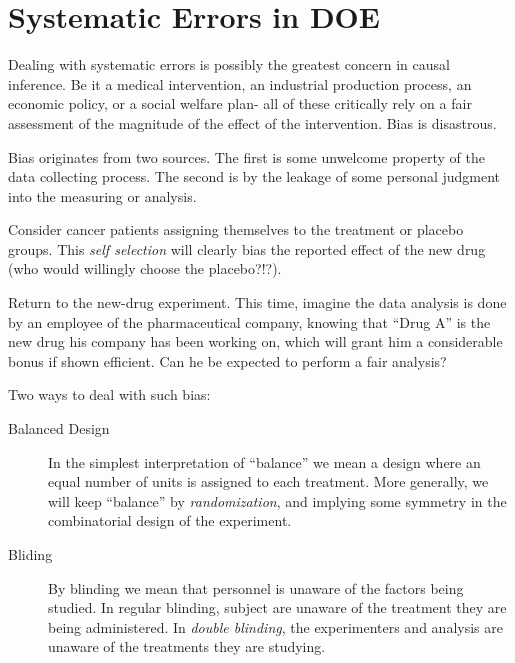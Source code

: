 \section{Systematic Errors in DOE}

Dealing with systematic errors is possibly the greatest concern in causal inference. 
Be it a medical intervention, an industrial production process, an economic policy, or a social welfare plan- all of these critically rely on a fair assessment of the magnitude of the effect of the intervention. Bias is disastrous. 

Bias originates from two sources.
The first is some unwelcome property of the data collecting process. 
The second is by the leakage of some personal judgment into the measuring or analysis. 

\begin{example}
	Consider cancer patients assigning themselves to the treatment or placebo groups. 
	This \emph{self selection} will clearly bias the reported effect of the new drug (who would willingly choose the placebo?!?). 
\end{example}


\begin{example}
	Return to the new-drug experiment. 
	This time, imagine the data analysis is done by an employee of the pharmaceutical company, knowing that ``Drug A'' is the new drug his company has been working on, which will grant him a considerable bonus if shown efficient. 
	Can he be expected to perform a fair analysis?
\end{example}

Two ways to deal with such bias:
\begin{description}
	\item [Balanced Design]
	In the simplest interpretation of ``balance'' we mean a design where an equal number of units is assigned to each treatment.
	More generally, we will keep ``balance'' by \emph{randomization}, and implying some symmetry in the combinatorial design of the experiment. 
	
	\item [Bliding]
	By blinding we mean that personnel is unaware of the factors being studied. 
	In regular blinding, subject are unaware of the treatment they are being administered. 
	In \emph{double blinding}, the experimenters and analysis are unaware of the treatments they are studying. 	 
	
\end{description}







